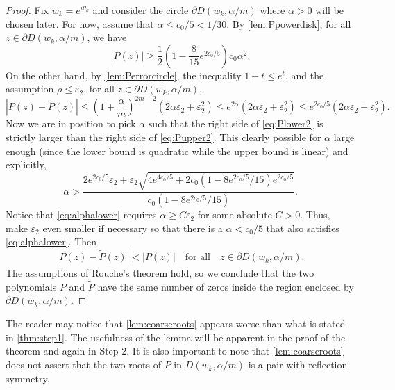 \documentclass[11pt]{article}
\theoremstyle{definition}
\numberwithin{theorem}{section}
\numberwithin{equation}{section}
\renewcommand{\tilde}{\widetilde}
\renewcommand{\epsilon}{\varepsilon}
\def\forallspace{\quad\text{for all}\quad}
\numberwithin{equation}{section}
\begin{document}
\begin{proof}
    Fix $w_k=e^{i\theta_k}$ and consider the circle $\partial D(w_k, \alpha/m)$ where $\alpha>0$ will be chosen later. For now, assume that $\alpha\leq c_0/5<1/30$. By \cref{lem:Ppowerdisk}, for all $z\in \partial D(w_k, \alpha/m)$, we have 
	\begin{equation}
		\label{eq:Plower2}
		|P(z)| 
		\geq \frac 12 \left( 1 - \frac{8}{15} e^{2c_0/5}\right) c_0 \alpha^2. 
	\end{equation}	
    On the other hand, by \cref{lem:Perrorcircle}, the inequality $1+t\leq e^t$, and the assumption $\rho\leq \epsilon_2$, for all $z\in \partial D(w_k, \alpha/m)$, 
	\begin{equation}
		\label{eq:Pupper2}
		|P(z)-\tilde P(z)|
		\leq \left(1 + \frac{\alpha} m \right)^{2m-2} (2 \alpha \epsilon_2 +\epsilon_2^2) 
        \leq e^{2\alpha} (2\alpha \epsilon_2+\epsilon_2^2)
        \leq e^{2c_0/5} (2\alpha \epsilon_2 + \epsilon_2^2). 
	\end{equation}
    Now we are in position to pick $\alpha$ such that the right side of \eqref{eq:Plower2} is strictly larger than the right side of \eqref{eq:Pupper2}. This clearly possible for $\alpha$ large enough (since the lower bound is quadratic while the upper bound is linear) and explicitly,
    \begin{equation}
        \label{eq:alphalower}
        \alpha > \frac{2e^{2c_0/5}\epsilon_2 + \epsilon_2 \sqrt{4e^{4c_0/5}+2c_0(1 - 8e^{2c_0/5}/15)e^{2c_0/5}}}{c_0(1 - 8e^{2c_0/5}/15)}.
    \end{equation}
    Notice that \eqref{eq:alphalower} requires $\alpha \geq C\epsilon_2$ for some absolute $C>0$. Thus, make $\epsilon_2$ even smaller if necessary so that there is a $\alpha<c_0/5$ that also satisfies \eqref{eq:alphalower}. Then 
    $$
    |P(z)-\tilde P(z)|
    < |P(z)| \forallspace z\in \partial D(w_k, \alpha/m).
    $$
    The assumptions of Rouche's theorem hold, so we conclude that the two polynomials $P$ and $\tilde P$ have the same number of zeros inside the region enclosed by $\partial D(w_k, \alpha/m)$. 
\end{proof}

The reader may notice that \cref{lem:coarseroots} appears worse than what is stated in \cref{thm:step1}. The usefulness of the lemma will be apparent in the proof of the theorem and again in Step 2. It is also important to note that \cref{lem:coarseroots} does not assert that the two roots of $\tilde P$ in $D(w_k,\alpha/m)$ is a pair with reflection symmetry.  
\end{document}
